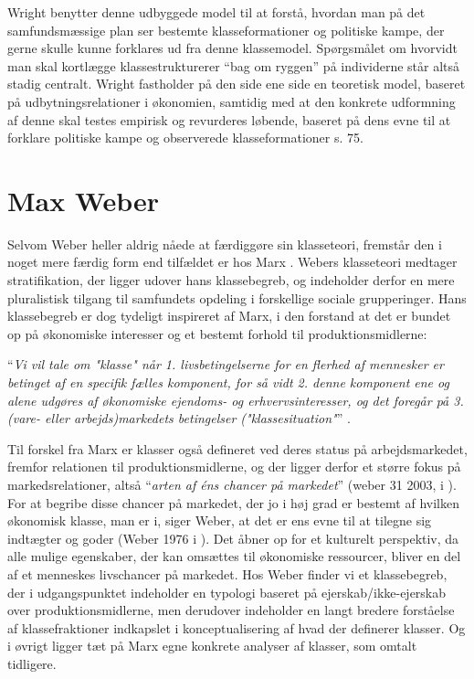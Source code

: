 Wright benytter denne udbyggede model til at forstå, hvordan man på det samfundsmæssige plan ser bestemte klasseformationer og politiske kampe, der gerne skulle kunne forklares ud fra denne klassemodel. Spørgsmålet om hvorvidt man skal kortlægge klassestrukturerer “bag om ryggen” på individerne står altså stadig centralt. Wright fastholder på den side ene side en teoretisk model, baseret på udbytningsrelationer i økonomien, samtidig med at den konkrete udformning af denne skal testes empirisk og revurderes løbende, baseret på dens evne til at forklare politiske kampe og observerede klasseformationer s. 75. 



\section{Max Weber \label{2_weber}}

Selvom Weber heller aldrig nåede at færdiggøre sin klasseteori, fremstår den i noget mere færdig form end tilfældet er hos Marx \parencite[28]{Harrits2014}. Webers klasseteori medtager stratifikation, der ligger udover hans klassebegreb, og indeholder derfor en mere pluralistisk tilgang til samfundets opdeling i forskellige sociale grupperinger. Hans klassebegreb er dog tydeligt inspireret af Marx, i den forstand at det er bundet op på økonomiske interesser og et bestemt forhold til produktionsmidlerne:
%
\begin{displayquote} “\textit{Vi vil tale om "klasse" når 1. livsbetingelserne for en flerhed af mennesker er betinget af en specifik fælles komponent, for så vidt 2. denne komponent ene og alene udgøres af økonomiske ejendoms- og erhvervsinteresser, og det foregår på 3. (vare- eller arbejds)markedets betingelser ("klassesituation"}” \parencite[302]{Weber1978}. \end{displayquote}
%
Til forskel fra Marx er klasser også defineret ved deres status på arbejdsmarkedet, fremfor relationen til produktionsmidlerne, og der ligger derfor et større fokus på markedsrelationer, altså “\emph{arten af éns chancer på markedet}” (weber 31 2003, i \parencite[29]{Harrits2014}). For at begribe disse chancer på markedet, der jo i høj grad er bestemt af hvilken økonomisk klasse, man er i, siger Weber, at det er ens evne til at tilegne sig indtægter og goder (Weber 1976 i \parencite[29]{Harrits2014}). Det åbner op for et kulturelt perspektiv, da alle mulige egenskaber, der kan omsættes til økonomiske ressourcer, bliver en del af et menneskes livschancer på markedet. Hos Weber finder vi et klassebegreb, der i udgangspunktet indeholder en typologi baseret på ejerskab/ikke-ejerskab over produktionsmidlerne, men derudover indeholder en langt bredere forståelse af klassefraktioner indkapslet i konceptualisering af hvad der definerer klasser. Og i øvrigt ligger tæt på Marx egne konkrete analyser af klasser, som omtalt tidligere.

